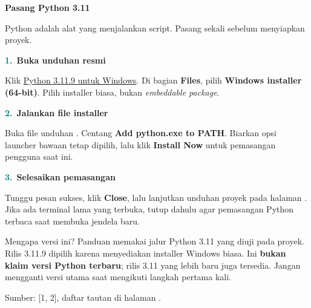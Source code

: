\documentclass[11pt,a4paper]{article}
\newcommand{\step}[2]{\par\addvspace{2mm}\noindent\textcolor{teal}{\textbf{#1.}}\ \textbf{#2}\par\nobreak}
\newcommand{\pagetitle}[3]{\clearpage{\color{teal}\small\bfseries LANGKAH #1}\par{\color{slate}\LARGE\bfseries #2}\par\vspace{2mm}#3\par\vspace{3mm}}
\newcommand{\source}[1]{{\footnotesize\color{blue}Sumber: [#1], daftar tautan di halaman \pageref{pg:references}.}\par}
\begin{document}
\pagetitle{1}{Pasang Python 3.11}{Python adalah alat yang menjalankan script. Pasang sekali sebelum menyiapkan proyek.}
\label{pg:python}
\step{1}{Buka unduhan resmi}
Klik \href{https://www.python.org/downloads/release/python-3119/}{Python 3.11.9 untuk Windows}.
Di bagian \textbf{Files}, pilih \textbf{Windows installer (64-bit)}.
Pilih installer biasa, bukan \emph{embeddable package}.
\step{2}{Jalankan file installer}
Buka file unduhan .
Centang \textbf{Add python.exe to PATH}. Biarkan opsi launcher bawaan tetap
dipilih, lalu klik \textbf{Install Now} untuk pemasangan pengguna saat ini.
\vspace{2mm}
\par\noindent{}\par
\step{3}{Selesaikan pemasangan}
Tunggu pesan sukses, klik \textbf{Close}, lalu lanjutkan unduhan proyek pada
halaman \pageref{pg:download}. Jika ada terminal lama yang terbuka, tutup dahulu
agar pemasangan Python terbaca saat membuka jendela baru.
\begin{panel}{Mengapa versi ini?}
Panduan memakai jalur Python 3.11 yang diuji pada proyek. Rilis 3.11.9 dipilih
karena menyediakan installer Windows biasa. Ini \textbf{bukan klaim versi Python
terbaru}; rilis 3.11 yang lebih baru juga tersedia. Jangan mengganti versi utama
saat mengikuti langkah pertama kali.
\end{panel}
\source{1, 2}
\end{document}
